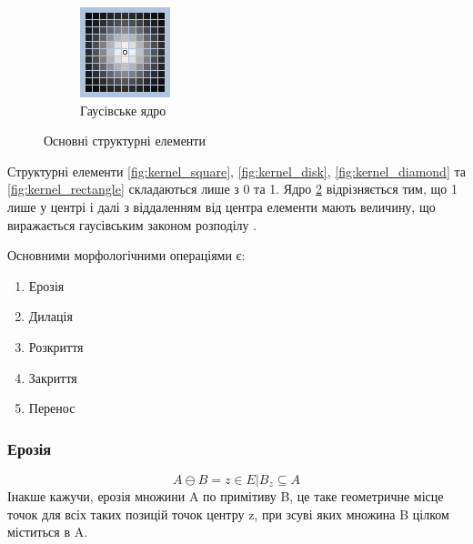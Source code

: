 \begin{figure}[H]
\begin{subfigure}[b]{0.2\textwidth}
		\includegraphics[width=\textwidth]{theory/img/kernel_gauss}
		\caption{Гаусівське ядро}
		\label{fig:kernel_gauss}
	\end{subfigure}
	\caption{Основні структурні елементи}	
\end{figure}

Структурні елементи \ref{fig:kernel_square}, \ref{fig:kernel_disk}, \ref{fig:kernel_diamond} та \ref{fig:kernel_rectangle} складаються лише з 0 та 1. Ядро \ref{fig:kernel_gauss} відрізняється тим, що 1 лише у центрі і далі з віддаленням від центра елементи мають величину, що виражається гаусівським законом розподілу \cite{ErodeDilate}.

Основними морфологічними операціями є:
\begin{enumerate}
	\item Ерозія
	\item Дилація
	\item Розкриття
	\item Закриття
	\item Перенос
\end{enumerate}


\subsubsection{Ерозія}
	\begin{equation}
	A \ominus B = { z \in E | B_{z} \subseteq A}
	\end{equation}
	Інакше кажучи, ерозія множини A по примітиву B, це таке геометричне місце точок для всіх таких позицій точок центру z, при зсуві яких множина B цілком міститься в A.
	
